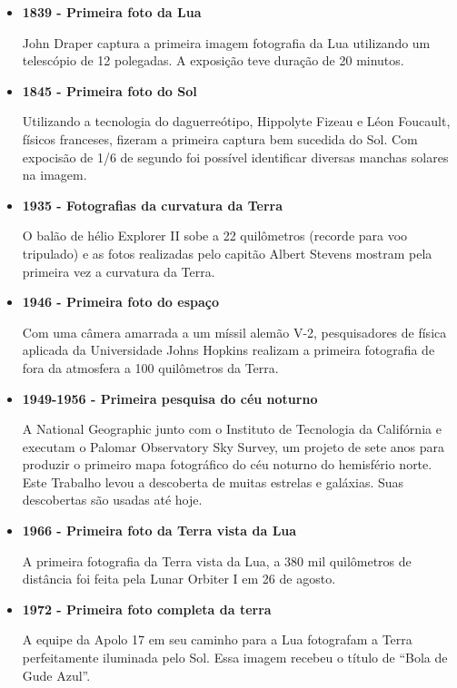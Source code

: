 \documentclass[
	article,			%
	12pt,				%
	oneside,			%
	a4paper,			%
	english,			%
	brazil,				%
	sumario=tradicional
	]{abntex2}
\begin{document}
\begin{itemize}
	\item \textbf{1839 - Primeira foto da Lua}

	John Draper captura a primeira imagem fotografia da Lua utilizando um 
	telescópio de 12 polegadas. A exposição teve duração de 20 minutos.
	\cite{fotografia2011ng}

	\item \textbf{1845 - Primeira foto do Sol}

	Utilizando a tecnologia do daguerreótipo, Hippolyte Fizeau e Léon Foucault,
	físicos franceses, fizeram a primeira captura bem sucedida do Sol. Com
	expocisão de 1/6 de segundo foi possível identificar diversas manchas
	solares na imagem. \cite{fotografia2011ng}

	\item \textbf{1935 - Fotografias da curvatura da Terra}

	O balão de hélio Explorer II sobe a 22 quilômetros (recorde para voo 
	tripulado) e as fotos realizadas pelo capitão Albert Stevens mostram pela
	primeira vez a curvatura da Terra. \cite{fotografia2011ng}

	\item \textbf{1946 - Primeira foto do espaço}

	Com uma câmera amarrada a um míssil alemão V-2, pesquisadores de física
	aplicada da Universidade Johns Hopkins realizam a primeira fotografia de 
	fora da atmosfera a 100 quilômetros da Terra. \cite{fotografia2011ng}

	\item \textbf{1949-1956 - Primeira pesquisa do céu noturno}

	A National Geographic junto com o Instituto de Tecnologia da Califórnia e
	executam o Palomar Observatory Sky Survey, um projeto de sete anos para
	produzir o primeiro mapa fotográfico do céu noturno do hemisfério norte.
	Este Trabalho levou a descoberta de muitas estrelas e galáxias. Suas
	descobertas são usadas até hoje. \cite{fotografia2011ng}

	\item \textbf{1966 - Primeira foto da Terra vista da Lua}

	A primeira fotografia da Terra vista da Lua, a 380 mil quilômetros de
	distância foi feita pela Lunar Orbiter I em 26 de agosto.
	\cite{fotografia2011ng}

	\item \textbf{1972 - Primeira foto completa da terra}

	A equipe da Apolo 17 em seu caminho para a Lua fotografam a Terra
	perfeitamente iluminada pelo Sol. Essa imagem recebeu o título de ``Bola de
	Gude Azul''. \cite{fotografia2011ng}


\end{itemize}
\end{document}
